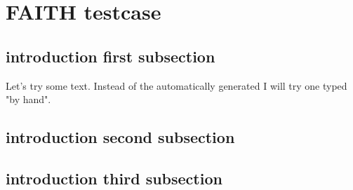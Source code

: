 \documentclass[crop=false]{standalone}
\begin{document}
\section{FAITH testcase}

\subsection{introduction first subsection}
Let's try some text. Instead of the automatically generated
I will try one typed "by hand".

\subsection{introduction second subsection}

\blindtext

\subsection{introduction third subsection}

\blindtext
\end{document}
